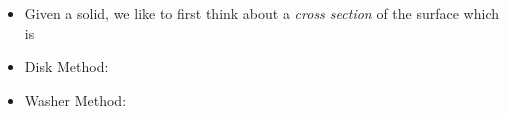 \documentclass[12pt,letterpaper]{article}
\begin{document}
\begin{itemize}

\item Given a solid, we like to first think about a \emph{cross section} of the surface which is %


\bigskip\bigskip

\item Disk Method: %



\vspace{2.5in}



\item Washer Method: %




\end{itemize}






%
%
%
%
%
%
%
%
%
%
%
%
%
%
%
%
%
%
%
%
\end{document}
